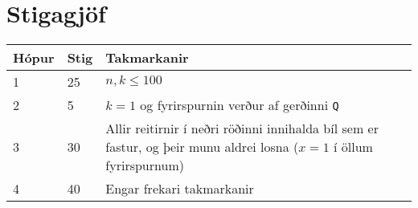 \section*{Stigagjöf}
\begin{tabular}{|l|l|l|}
\hline
Hópur & Stig & Takmarkanir \\ \hline
1     & 25   & $n,k \leq 100$ \\ \hline
2     & 5    & $k = 1$ og fyrirspurnin verður af gerðinni \texttt{Q} \\ \hline
3     & 30   & Allir reitirnir í neðri röðinni innihalda bíl sem er fastur, og þeir munu aldrei losna ($x=1$ í öllum fyrirspurnum) \\ \hline
4     & 40   & Engar frekari takmarkanir\\ \hline
\end{tabular}


